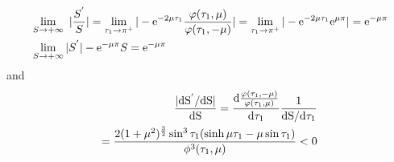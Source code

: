 \documentclass[a4paper,10pt]{article}
\begin{document}
\begin{enumerate}
		\begin{align}
		&\lim_{S \rightarrow +\infty}\ |\frac{S^{'}}{S}|=\lim_{\tau_1\rightarrow \pi^+} |-{\rm e}^{-2\mu\tau_1}\frac{\varphi(\tau_1,\mu)}{\varphi(\tau_1,-\mu)}|=\lim_{\tau_1\rightarrow \pi^+} |-{\rm e}^{-2\mu\tau_1}{\rm e}^{\mu \pi}|= {\rm e}^{-\mu \pi}\\
		&\lim_{S \rightarrow +\infty} |S^{'}|-{\rm e}^{-\mu \pi}S={\rm e}^{-\mu \pi}
		\label{eq: asymptotic line}
		\end{align}
		and 
		\begin{align}
		\nonumber
		\frac{|\rm d S^{'}/\rm d S|}{\rm dS}=\frac{\rm d \frac{\varphi(\tau_1,-\mu)}{\varphi(\tau_1,\mu)}} {\rm d \tau_1} \frac{1}{\rm d S/\rm d \tau_1}\\ 
		= \frac{2(1+\mu^2)^{\frac{3}{2}} \sin^3{\tau_1} (\sinh{\mu \tau_1} - \mu \sin{\tau_1})}{\phi^3(\tau_1,\mu)}<0
		\end{align}
		\begin{figure}[htbp]
			\centering
			\quad
			\quad
\end{figure}
\end{enumerate}
\end{document}
